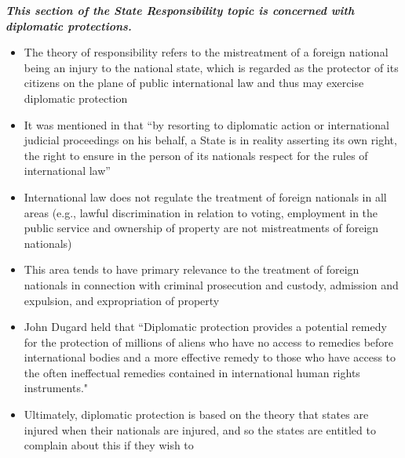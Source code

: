 \label{sec:Topic 11}
\begin{tcolorbox}
    \textbf{\textit{This section of the State Responsibility topic is concerned with diplomatic protections.}}
\end{tcolorbox}

\begin{itemize}
    \item The theory of responsibility refers to the mistreatment of a foreign national being an injury to the national state, which is regarded as the protector of its citizens on the plane of public international law and thus may exercise diplomatic protection
    \item It was mentioned in  that ``by resorting to diplomatic action or international judicial proceedings on his behalf, a State is in reality asserting its own right, the right to ensure in the person of its nationals respect for the rules of international law''
    \item International law does not regulate the treatment of foreign nationals in all areas (e.g., lawful discrimination in relation to voting, employment in the public service and ownership of property are not mistreatments of foreign nationals)
    \item This area tends to have primary relevance to the treatment of foreign nationals in connection with criminal prosecution and custody, admission and expulsion, and expropriation of property
    \item John Dugard held that ``Diplomatic protection provides a potential remedy for the protection of millions of aliens who have no access to remedies before international bodies and a more effective remedy to those who have access to the often ineffectual remedies contained in international human rights instruments."
    \item Ultimately, diplomatic protection is based on the theory that states are injured when their nationals are injured, and so the states are entitled to complain about this if they wish to
\end{itemize}

